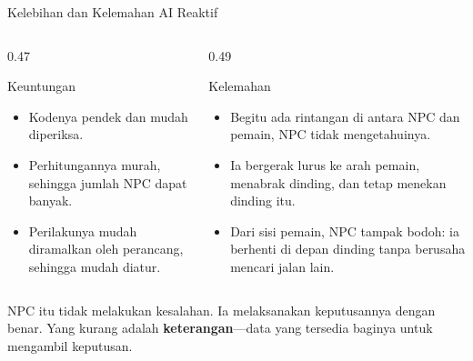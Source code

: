\documentclass[aspectratio=169,10pt]{beamer}
\begin{document}
\begin{frame}{Kelebihan dan Kelemahan AI Reaktif}
\begin{columns}[T,onlytextwidth]
  \begin{column}{0.47\textwidth}
    \begin{exampleblock}{Keuntungan}
      \begin{itemize}
        \item Kodenya pendek dan mudah diperiksa.
        \item Perhitungannya murah, sehingga jumlah NPC dapat banyak.
        \item Perilakunya mudah diramalkan oleh perancang, sehingga mudah
              diatur.
      \end{itemize}
    \end{exampleblock}
  \end{column}
  \begin{column}{0.49\textwidth}
    \begin{block}{Kelemahan}
      \begin{itemize}
        \item Begitu ada rintangan di antara NPC dan pemain, NPC tidak
              mengetahuinya.
        \item Ia bergerak lurus ke arah pemain, menabrak dinding, dan tetap
              menekan dinding itu.
        \item Dari sisi pemain, NPC tampak bodoh: ia berhenti di depan dinding
              tanpa berusaha mencari jalan lain.
      \end{itemize}
    \end{block}
  \end{column}
\end{columns}
\vspace{0.12cm}
\begin{kotak}
NPC itu tidak melakukan kesalahan. Ia melaksanakan keputusannya dengan benar.
Yang kurang adalah \textbf{\mbox{keterangan}}---data yang tersedia baginya
untuk mengambil keputusan.
\end{kotak}
\end{frame}
\end{document}
